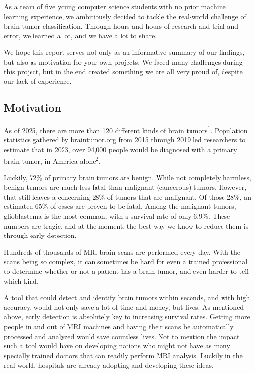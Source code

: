 \documentclass[conference]{IEEEtran}
\begin{document}
As a team of five young computer science students with no prior machine learning experience, we ambitiously decided to tackle the real-world challenge of brain tumor classification. Through hours and hours of research and trial and error, we learned a lot, and we have a lot to share. 

We hope this report serves not only as an informative summary of our findings, but also as motivation for your own projects. We faced many challenges during this project, but in the end created something we are all very proud of, despite our lack of experience.

\subsection{\large Motivation}

As of 2025, there are more than 120 different kinds of brain tumors\textsuperscript{1}. Population statistics gathered by braintumor.org from 2015 through 2019 led researchers to estimate that in 2023, over 94,000 people would be diagnosed with a primary brain tumor, in America alone\textsuperscript{2}. 

Luckily, 72\% of primary brain tumors are benign. While not completely harmless, benign tumors are much less fatal than malignant (cancerous) tumors. However, that still leaves a concerning 28\% of tumors that are malignant. Of those 28\%, an estimated 65\% of cases are proven to be fatal. Among the malignant tumors, glioblastoma is the most common, with a survival rate of only 6.9\%. These numbers are tragic, and at the moment, the best way we know to reduce them is through early detection.

Hundreds of thousands of MRI brain scans are performed every day. With the scans being so complex, it can sometimes be hard for even a trained professional to determine whether or not a patient has a brain tumor, and even harder to tell which kind. 

A tool that could detect and identify brain tumors within seconds, and with high accuracy, would not only save a lot of time and money, but lives. As mentioned above, early detection is absolutely key to increasing survival rates. Getting more people in and out of MRI machines and having their scans be automatically processed and analyzed would save countless lives. Not to mention the impact such a tool would have on developing nations who might not have as many specially trained doctors that can readily perform MRI analysis. Luckily in the real-world, hospitals are already adopting and developing these ideas. 
\end{document}
